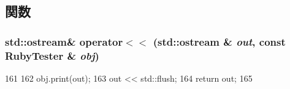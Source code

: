 \subsection{関数}
\hypertarget{RubyTester_8hh_ab036363b66335c1423674098737740cf}{
\subsubsection[{operator$<$$<$}]{\setlength{\rightskip}{0pt plus 5cm}std::ostream\& operator$<$$<$ (std::ostream \& {\em out}, \/  const {\bf RubyTester} \& {\em obj})}}
\label{RubyTester_8hh_ab036363b66335c1423674098737740cf}



\begin{DoxyCode}
161 {
162     obj.print(out);
163     out << std::flush;
164     return out;
165 }
\end{DoxyCode}
